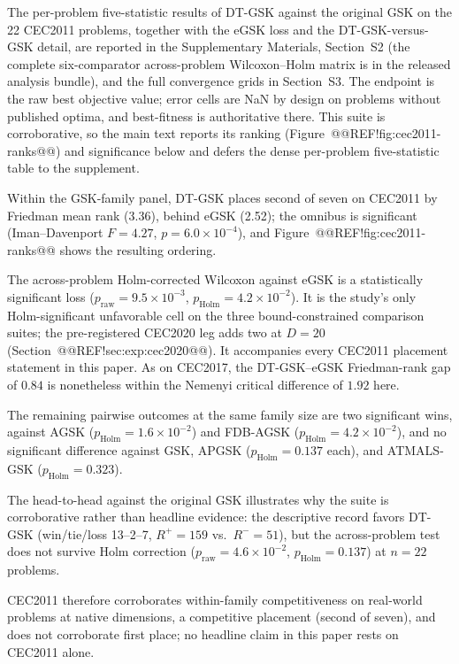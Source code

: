 \documentclass[10pt,a4paper]{article}
\newcommand{\dtgsk}{DT-GSK}
\newcommand{\atmals}{ATMALS-GSK}
\newcommand{\agsk}{AGSK}
\newcommand{\apgsk}{APGSK}
\newcommand{\fdbagsk}{FDB-AGSK}
\newcommand{\egsk}{eGSK}
\begin{document}
The per-problem five-statistic results of \dtgsk{} against the original
GSK on the 22 CEC2011 problems, together with the \egsk{} loss and the
\dtgsk{}-versus-GSK detail, are reported in the Supplementary Materials,
Section~S2 (the complete six-comparator across-problem Wilcoxon--Holm
matrix is in the released analysis bundle), and the full convergence grids
in Section~S3. The endpoint is the raw best objective value; error cells
are NaN by design on problems without published optima, and best-fitness
is authoritative there. This suite is corroborative, so the main text
reports its ranking (Figure~@@REF!fig:cec2011-ranks@@) and significance
below and defers the dense per-problem five-statistic table to the
supplement.


Within the GSK-family panel, \dtgsk{} places second of seven on
CEC2011 by Friedman mean rank (3.36), behind \egsk{} (2.52); the
omnibus is significant (Iman--Davenport $F = 4.27$,
$p = 6.0 \times 10^{-4}$), and Figure~@@REF!fig:cec2011-ranks@@ shows
the resulting ordering.

The across-problem Holm-corrected Wilcoxon against \egsk{} is a
statistically significant loss
($p_{\mathrm{raw}} = 9.5 \times 10^{-3}$,
$p_{\mathrm{Holm}} = 4.2 \times 10^{-2}$). It is the study's only
Holm-significant unfavorable cell on the three bound-constrained comparison
suites; the pre-registered CEC2020 leg adds two at $D = 20$
(Section~@@REF!sec:exp:cec2020@@). It
accompanies every CEC2011 placement statement in this paper. As on CEC2017,
the \dtgsk{}--\egsk{} Friedman-rank gap of $0.84$ is nonetheless within the
Nemenyi critical difference of $1.92$ here.

The remaining pairwise outcomes at the same family size are two
significant wins, against \agsk{}
($p_{\mathrm{Holm}} = 1.6 \times 10^{-2}$) and \fdbagsk{}
($p_{\mathrm{Holm}} = 4.2 \times 10^{-2}$), and no significant difference against GSK,
\apgsk{} ($p_{\mathrm{Holm}} = 0.137$ each), and \atmals{}
($p_{\mathrm{Holm}} = 0.323$).

The head-to-head against the original GSK illustrates why the suite
is corroborative rather than headline evidence: the descriptive
record favors \dtgsk{} (win/tie/loss 13--2--7,
$R^{+} = 159$ vs.\ $R^{-} = 51$), but the across-problem test does
not survive Holm correction
($p_{\mathrm{raw}} = 4.6 \times 10^{-2}$,
$p_{\mathrm{Holm}} = 0.137$) at $n = 22$ problems.

CEC2011 therefore corroborates within-family competitiveness on
real-world problems at native dimensions, a competitive placement
(second of seven), and does not corroborate first place; no headline
claim in this paper rests on CEC2011 alone.
\end{document}

